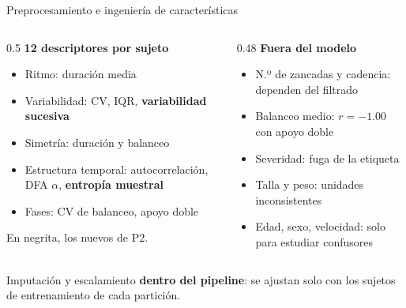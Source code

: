 \documentclass[aspectratio=169,10pt]{beamer}
\begin{document}
\begin{frame}{Preprocesamiento e ingeniería de características}
  \begin{columns}[T]
    \begin{column}{0.5\textwidth}
      \textbf{12 descriptores por sujeto}
      \begin{itemize}
        \item Ritmo: duración media
        \item Variabilidad: CV, IQR, \textbf{variabilidad sucesiva}
        \item Simetría: duración y balanceo
        \item Estructura temporal: autocorrelación, DFA $\alpha$, \textbf{entropía muestral}
        \item Fases: CV de balanceo, apoyo doble
      \end{itemize}
      \footnotesize En negrita, los nuevos de P2.
    \end{column}
    \begin{column}{0.48\textwidth}
      \textbf{Fuera del modelo}
      \begin{itemize}
        \item N.º de zancadas y cadencia: dependen del filtrado
        \item Balanceo medio: $r=-1.00$ con apoyo doble
        \item Severidad: fuga de la etiqueta
        \item Talla y peso: unidades inconsistentes
        \item Edad, sexo, velocidad: solo para estudiar confusores
      \end{itemize}
    \end{column}
  \end{columns}

  \vspace{0.8em}
  Imputación y escalamiento \textbf{dentro del pipeline}: se ajustan solo con los sujetos de entrenamiento de cada partición.
\end{frame}
\end{document}
